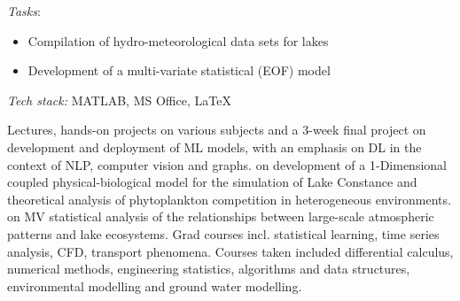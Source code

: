 \documentclass[
	a4paper,
]{fortysecondscv}
\begin{document}
\begin{cvtable}[1.0]
	{\href{https://https://www.metu.edu.tr/}{\color{pblue}{METU, Turkey}}}
	{\textit{Tasks}:
	\begin{itemize}[topsep=0pt,itemsep=0pt,partopsep=0pt, parsep=0pt, leftmargin=*]
     \item Compilation of hydro-meteorological data sets for lakes
     \item Development of a multi-variate statistical (EOF) model
     \end{itemize}
     \textit{Tech stack:} MATLAB, MS Office, \LaTeX \\
     }
\end{cvtable}

\begin{cvtable}[1.0]
		{Lectures, hands-on projects on various subjects and a 3-week final project on development and deployment of ML models, with an emphasis on DL in the context of NLP, computer vision and graphs.}
		{\href{https://kops.uni-konstanz.de/bitstream/handle/123456789/16454/Kerimoglu_2011_PhD_Dissertation.pdf?isAllowed=y&sequence=1}{\color{pblue}{Thesis}} on development of a 1-Dimensional coupled physical-biological model for the simulation of Lake Constance and theoretical analysis of phytoplankton competition in heterogeneous environments.}
		{\href{http://etd.lib.metu.edu.tr/upload/12609272/index.pdf}{\color{pblue}{Thesis}} on MV statistical analysis of the relationships between large-scale atmospheric patterns and lake ecosystems. Grad courses incl. statistical learning, time series analysis, CFD, transport phenomena.}
		{Courses taken included differential calculus, numerical methods, engineering statistics, algorithms and data structures, environmental modelling and ground water modelling.}
\end{cvtable}
\end{document}
